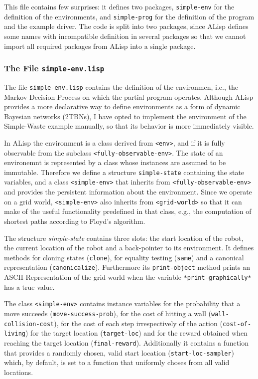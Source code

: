 \documentclass[a4paper]{amsart}
\begin{document}
This file contains few surprises: it defines two packages,
\texttt{simple-env} for the definition of the environments, and
\texttt{simple-prog} for the definition of the program and the example
driver.  The code is split into two packages, since ALisp defines some
names with incompatible definition in several packages so that we
cannot import all required packages from ALisp into a single package.

\subsubsection{The File \texttt{simple-env.lisp}}
\label{sec:file-simple-env.lisp} 

The file \texttt{simple-env.lisp} contains the definition of the
environmen, i.e., the Markov Decision Process on which the partial
program operates.  Although ALisp provides a more declarative way to
define environments as a form of dynamic Bayesian networks (2TBNs),
I have opted to implement the environment of the Simple-Waste example
manually, so that its behavior is more immediately visible.

In ALisp the environment is a class derived from \verb|<env>|, and if
it is fully observable from the subclass
\verb|<fully-observable-env>|.  The state of an environemnt is
represented by a class whose instances are assumed to be immutable.
Therefore we define a structure \texttt{simple-state} containing the
state variables, and a class \verb|<simple-env>| that inherits from
\verb|<fully-observable-env>| and provides the persistent information
about the environment.  Since we operate on a grid world,
\verb|<simple-env>| also inherits from \verb|<grid-world>| so that it
can make of the useful functionality predefined in that class, e.g.,
the computation of shortest paths according to Floyd's algorithm.

The structure \emph{simple-state} contains three slots: the start
location of the robot, the current location of the robot and a
back-pointer to its environment.  It defines methods for cloning
states (\texttt{clone}), for equality testing (\texttt{same}) and a
canonical representation (\texttt{canonicalize}).  Furthermore its
\texttt{print-object} method prints an ASCII-Representation of the
grid-world when the variable \texttt{*print-graphically*} has a true
value.

The class \verb|<simple-env>| contains instance variables for the
probability that a move succeeds (\texttt{move-success-prob}), for the
cost of hitting a wall (\texttt{wall-collision-cost}), for the cost of
each step irrespectively of the action (\texttt{cost-of-living}) for
the target location (\texttt{target-loc}) and for the reward obtained
when reaching the target location (\texttt{final-reward}).
Additionally it contains a function that provides a randomly chosen,
valid start location (\texttt{start-loc-sampler}) which, by default,
is set to a function that uniformly choses from all valid locations.
\end{document}
